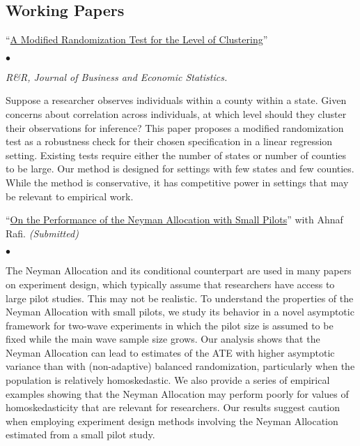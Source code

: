 \documentclass[margin,line]{res}
\newenvironment{list1}{
  \begin{list}{\ding{113}}{%
      \setlength{\itemsep}{.025in}
      \setlength{\parsep}{0in} \setlength{\parskip}{0in}
      \setlength{\topsep}{0in} \setlength{\partopsep}{0in}
      \setlength{\leftmargin}{0.17in}}}{\end{list}}
\newenvironment{list2}{
  \begin{list}{$\bullet$}{%
      \setlength{\itemsep}{0in}
      \setlength{\parsep}{0in} \setlength{\parskip}{0in}
      \setlength{\topsep}{0in} \setlength{\partopsep}{0in}
      \setlength{\leftmargin}{0.2in}}}{\end{list}}
\begin{document}
\begin{resume}
\section{Working Papers}
\begin{list1}
\item[] ``\href{https://arxiv.org/pdf/2106.05503v3.pdf}{A Modified Randomization Test for the Level of Clustering}''
	\begin{list2}
		\item[] \emph{R\&R, Journal of Business and Economic Statistics.}
		\item[] Suppose a researcher observes individuals within a county within a state. Given concerns about correlation across individuals, at which level should they cluster their observations for inference? This paper proposes a modified randomization test as a robustness check for their chosen specification in a linear regression setting. Existing tests require either the number of states or number of counties to be large. Our method is designed for settings with few states and few counties. While the method is conservative, it has competitive power in settings that may be relevant to empirical work. \\
	\end{list2}
\item[] ``\href{https://arxiv.org/pdf/2206.04643.pdf}{On the Performance of the Neyman Allocation with Small Pilots}'' with Ahnaf Rafi. \emph{(Submitted)}
	\begin{list2}
		\item[] The Neyman Allocation and its conditional counterpart are used in many papers on experiment design, which typically assume that researchers have access to large pilot studies. This may not be realistic. To understand the properties of the Neyman Allocation with small pilots, we study its behavior in a novel asymptotic framework for two-wave experiments in which the pilot size is assumed to be fixed while the main wave sample size grows. Our analysis shows that the Neyman Allocation can lead to estimates of the ATE with higher asymptotic variance than with (non-adaptive) balanced randomization, particularly when the population is relatively homoskedastic. We also provide a series of empirical examples showing that the Neyman Allocation may perform poorly for values of homoskedasticity that are relevant for researchers. Our results suggest caution when employing experiment design methods involving the Neyman Allocation estimated from a small pilot study. \\
	\end{list2}
	

\end{list1}
\end{resume}
\end{document}

